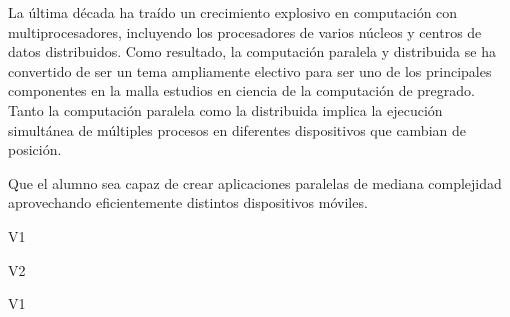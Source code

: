 \begin{syllabus}


\begin{justification}
La última década ha traído un crecimiento explosivo en computación con multiprocesadores, incluyendo 
los procesadores de varios núcleos y centros de datos distribuidos. Como resultado, la computación 
paralela y distribuida se ha convertido de ser un tema ampliamente electivo para ser uno de los principales componentes
en la malla estudios en ciencia de la computación de pregrado. Tanto la computación paralela como la distribuida implica 
la ejecución simultánea de múltiples procesos en diferentes dispositivos que cambian de posición.
\end{justification}

\begin{goals}
\item Que el alumno sea capaz de crear aplicaciones paralelas de mediana complejidad aprovechando eficientemente distintos dispositivos móviles.
\end{goals}

\begin{outcomes}{V1}
    \item {} 
    \item {}
    \item {}
    \item {}
\end{outcomes}

\begin{outcomes}{V2}
    \item {} 
    \item {}
    \item {}
\end{outcomes}

\begin{competences}{V1}
    \item {}
    \item {}
    \item {}
    \item {}
    \item {}
    \item {} 	
\end{competences}


\end{syllabus}
